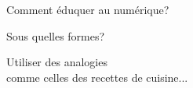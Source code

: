 \documentclass{beamer}
\begin{document}
\begin{frame}
\begin{center}
\Huge {Comment éduquer au numérique?}
\end{center}
\end{frame}

\begin{frame}
\begin{center}
\Huge {Sous quelles formes?}
\end{center}
\end{frame}

\begin{frame}
\begin{center}
\Huge{Utiliser des analogies \\comme celles des recettes de cuisine...}
\end{center}
\end{frame}
\end{document}
